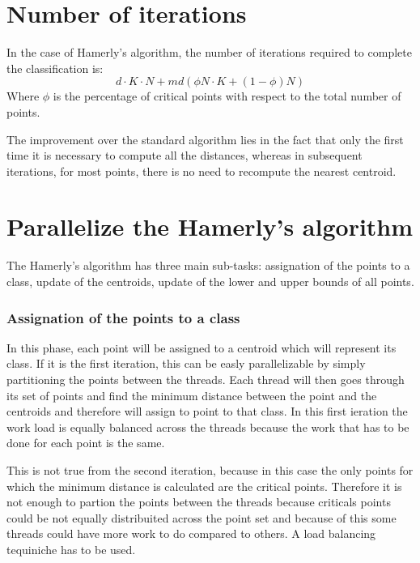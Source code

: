 \documentclass{report}
\begin{document}
\begin{minipage}[b]{0.48\textwidth}
  \section*{Number of iterations}
  In the case of Hamerly's algorithm, the number of iterations required to complete the classification is:
  \begin{equation}
      d\cdot K\cdot N + md(\phi N\cdot K + (1 - \phi)N)
  \end{equation}
  Where $\phi$ is the percentage of critical points with respect to the total number of points.

  The improvement over the standard algorithm lies in the fact that only the first time it is necessary to compute all the distances, whereas in subsequent iterations, for most points, there is no need to recompute the nearest centroid.

  \section*{Parallelize the Hamerly's algorithm}
  The Hamerly's algorithm has three main sub-tasks: assignation of the points to a class, update of the centroids, update of the lower and upper bounds of all points.

  \subsubsection*{Assignation of the points to a class}
  In this phase, each point will be assigned to a centroid which will represent its class. If it is the first iteration, this can be easly parallelizable by simply partitioning the points between the threads. Each thread will then goes through its set of points and find the minimum distance between the point and the centroids and therefore will assign to point to that class. In this first ieration the work load is equally balanced across the threads because the work that has to be done for each point is the same.

  This is not true from the second iteration, because in this case the only points for which the minimum distance is calculated are the critical points. Therefore it is not enough to partion the points between the threads because criticals points could be not equally distribuited across the point set and because of this some threads could have more work to do compared to others. A load balancing tequiniche has to be used.


\end{minipage}
\end{document}
